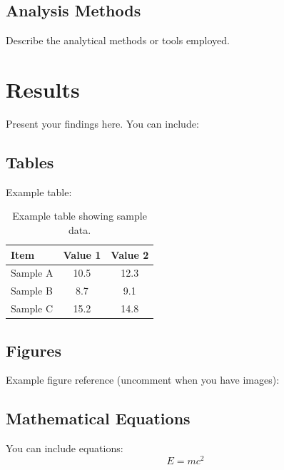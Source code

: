 \documentclass[12pt, a4paper]{article}
\begin{document}
\subsection{Analysis Methods}
Describe the analytical methods or tools employed.

\section{Results}
\label{sec:results}

Present your findings here. You can include:

\subsection{Tables}

Example table:
\begin{table}[H]
    \centering
    \begin{tabular}{lcc}
        \toprule
        \textbf{Item} & \textbf{Value 1} & \textbf{Value 2} \\
        \midrule
        Sample A & 10.5 & 12.3 \\
        Sample B & 8.7 & 9.1 \\
        Sample C & 15.2 & 14.8 \\
        \bottomrule
    \end{tabular}
    \caption{Example table showing sample data.}
    \label{tab:example}
\end{table}

\subsection{Figures}

Example figure reference (uncomment when you have images):

\subsection{Mathematical Equations}

You can include equations:
\begin{equation}
    E = mc^2
    \label{eq:einstein}
\end{equation}
\end{document}
